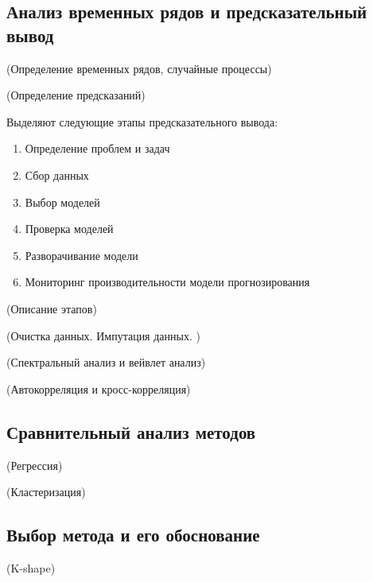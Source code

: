 \subsection{Анализ временных рядов и предсказательный вывод}

(Определение временных рядов, случайные процессы)

(Определение предсказаний)

Выделяют следующие этапы предсказательного вывода:

\begin{enumerate}
    \item Определение проблем и задач
    \item Сбор данных
    \item Выбор моделей
    \item Проверка моделей
    \item Разворачивание модели
    \item Мониторинг производительности модели прогнозирования
\end{enumerate}


(Описание этапов)

(Очистка данных. Импутация данных. )

(Спектральный анализ и вейвлет анализ)

(Автокорреляция и кросс-корреляция)

\subsection{Сравнительный анализ методов}

(Регрессия)

(Кластеризация)


\subsection{Выбор метода и его обоснование}

(K-shape)

\clearpage
